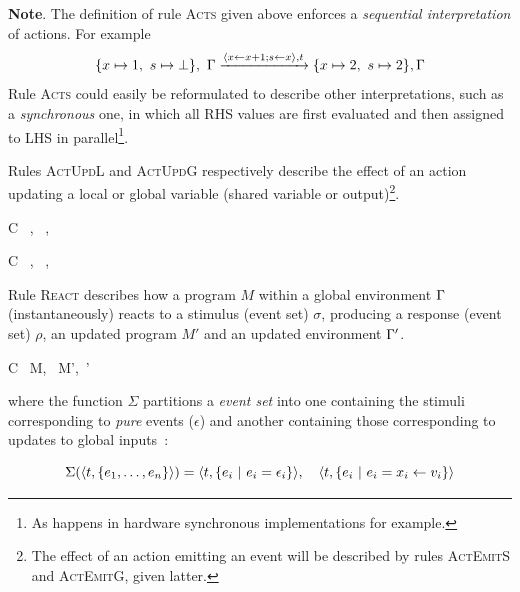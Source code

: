 \medskip \textbf{Note}. The definition of rule \textsc{Acts} given above enforces a \emph{sequential
  interpretation} of actions. For example
$$
\{x \mapsto 1,\ s \mapsto \bot \},\ \Gamma \xrightarrow{\langle x \gets x+1; s \gets x\rangle,t}
\{x \mapsto 2,\ s \mapsto 2 \}, \Gamma
$$
Rule \textsc{Acts} could easily be reformulated to describe other interpretations, such as a
\emph{synchronous} one, in which all RHS values are first evaluated
and then assigned to LHS in parallel\footnote{As happens in hardware synchronous implementations for
  example.}.


\medskip \step Rules \textsc{ActUpdL} and \textsc{ActUpdG} respectively describe the
effect of an action updating a local or global variable (shared variable or output)\footnote{The
  effect of an action emitting an event will be described by rules \textsc{ActEmitS} and \textsc{ActEmitG},
  given latter.}.

\begin{multicols}{2}
{C \vdash\ \vars,\ \env {} \vars[x\mapsto v],\ \env}

{C \vdash\ \vars,\ \env {} \vars,\ \env[x\mapsto v]}
\end{multicols}

\step Rule \textsc{React} describes how a program $M$ within a global environment $\Gamma$
(instantaneously) reacts to a stimulus (event set) $\sigma$, producing a response (event set)
$\rho$, an updated program $M'$ and an updated environment $\Gamma'$.

{C \vdash\ M,\ \env \xrightarrow[\rho_e]{\sigma} M',\ \env'}

where the function $\Sigma$ partitions a \emph{event set} into one containing the stimuli
corresponding to \emph{pure} events ($\epsilon$) and another containing those corresponding to updates to
global inputs~:

\begin{equation*}
  \Sigma(\langle t, \{e_1,\ldots,e_n\}\rangle) = \langle t, \{ e_i ~|~ e_i = \epsilon_i \}\rangle,\quad\langle t, \{
        e_i ~|~ e_i = x_i \gets v_i \}\rangle
\end{equation*}

